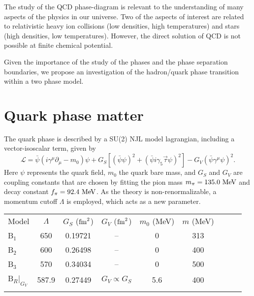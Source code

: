 \documentclass{ws-ijmpcs}
\begin{document}
The study of the QCD phase-diagram is relevant to the understanding of many aspects of the physics in our universe. Two of the aspects of interest are related to relativistic heavy ion collisions (low densities, high temperatures) and stars (high densities, low temperatures). However, the direct solution of QCD is not possible at finite chemical potential.

Given the importance of the study of the phases and the phase separation boundaries, we propose an investigation of the hadron/quark phase transition within a two phase model.

\section{Quark phase matter}

The quark phase is described by a SU(2) NJL model lagrangian, including a vector-isoscalar term, given by \cite{Buballa2005}
\begin{equation}\label{Eq:LagNJL-SU2-Bub}
	\mathcal{L} =\bar{\psi}(i\gamma^\mu\partial_\mu - m_0)\psi + G_S[(\bar{\psi}\psi)^2 + (\bar{\psi}i\gamma_5\vec{\tau}\psi)^2] - G_V(\bar{\psi}\gamma^\mu \psi)^2.
\end{equation}
%
Here $\psi$ represents the quark field, $m_0$ the quark bare mass, and $G_S$ and $G_V$ are coupling constants that are chosen by fitting the pion mass $m_\pi = 135.0~\rm{MeV}$ and decay constant $f_\pi = 92.4~\rm{MeV}$. As the theory is non-renormalizable, a momentum cutoff $\Lambda$ is employed, which acts as a new parameter.

\begin{table}[!ht]
{\begin{tabular}{@{}lcccccccc@{}}\toprule
Model &  $\Lambda$ & $G_S$ ($\rm{fm}^2$) & $G_V$ ($\rm{fm}^2$) & $m_0$ (MeV) & $m$ (MeV) \\ \colrule
B$_1$ & 650 & 0.19721 & -- & 0 & 313 \\
B$_2$ & 600 & 0.26498 & -- & 0 & 400 \\
B$_3$ & 570 & 0.34034 & -- & 0 & 500 \\
B$_R|_{G_V}$ & 587.9 & 0.27449 & $G_V \propto G_S$ & 5.6 & 400\\
\botrule
\end{tabular} \label{Tab:Parametros_NJL}}
\end{table}
\end{document}
